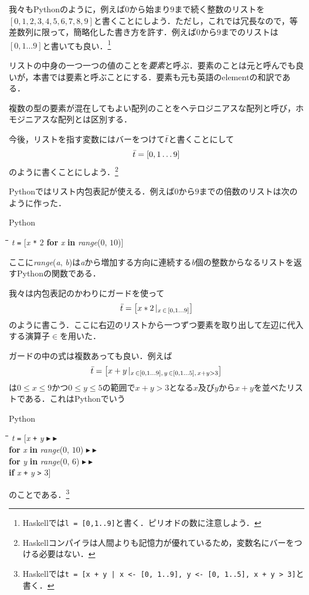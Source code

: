 \documentclass[twocolumn]{jsbook}
\newcommand{\programminglanguage}[1]{\textsf{#1}}
\newcommand{\haskell}{\programminglanguage{Haskell}}
\newcommand{\python}{\programminglanguage{Python}}
\newcommand{\code}[1]{\texttt{#1}}
\newcommand{\keyword}[1]{{\emph{#1}}}
\newenvironment{pythoncode}{\begin{itembox}[r]{\python}}{\end{itembox}}
\newenvironment{pythontab}{\begin{tabbing}\hspace*{1em}\=\hspace*{1em}\=\hspace*{1em}\=\hspace*{1em}\=\kill}{\end{tabbing}}
\newcommand{\pthnId}[1]{\textit{#1}}
\newcommand{\pthnKeyword}[1]{\textbf{#1}}
\newcommand{\pthnOp}[1]{\texttt{#1}}
\newcommand{\pthnNextLine}{$\blacktriangleright\blacktriangleright$}
\newcommand{\hsklList}[1]{\Bar{#1}}
\DeclareMathOperator{\mathFrom}{\in}
\newcommand{\mathGuard}[1]{\mathop{\mid_{#1}}}
\begin{document}
我々も\python のように，例えば$0$から始まり$9$まで続く整数のリストを$[0,1,2,3,4,5,6,7,8,9]$と書くことにしよう．ただし，これでは冗長なので，等差数列に限って，簡略化した書き方を許す．例えば$0$から$9$までのリストは$[0,1\dots9]$と書いても良い．\footnote{\haskell では\code{l = [0,1..9]}と書く．ピリオドの数に注意しよう．}

リストの中身の一つ一つの値のことを\keyword{要素}と呼ぶ．要素のことは元と呼んでも良いが，本書では要素と呼ぶことにする．要素も元も英語のelementの和訳である．

複数の型の要素が混在してもよい配列のことをヘテロジニアスな配列と呼び，ホモジニアスな配列とは区別する．

今後，リストを指す変数にはバーをつけて$\hsklList{t}$と書くことにして
\begin{equation}
\hsklList{t}=[0,1\dots9]
\end{equation}
のように書くことにしよう．\footnote{\haskell コンパイラは人間よりも記憶力が優れているため，変数名にバーをつける必要はない．}

\python ではリスト内包表記が使える．例えば$0$から$9$までの倍数のリストは次のように作った．
\begin{pythoncode}
\begin{pythontab}
\pthnId{t} \pthnOp{=} [\pthnId{x} \pthnOp{*} $2$ \pthnKeyword{for} \pthnId{x} \pthnKeyword{in} \pthnId{range}($0$, $10$)]
\end{pythontab}
\end{pythoncode}
ここに\pthnId{range}(\pthnId{a}, \pthnId{b})は\pthnId{a}から増加する方向に連続する\pthnId{b}個の整数からなるリストを返す\python の関数である．

我々は内包表記のかわりにガードを使って
\begin{equation}
\hsklList{t}=\left[x*2\mathGuard{x\mathFrom{[0,1\dots9]}}\right]
\end{equation}
のように書こう．ここに右辺のリストから一つずつ要素を取り出して左辺に代入する演算子$\mathFrom$を用いた．

ガードの中の式は複数あっても良い．例えば
\begin{equation}
\hsklList{t}=\left[x+y\mathGuard{x\mathFrom[0,1\dots9],\,y\mathFrom[0,1\dots5],\,x+y>3}\right]
\end{equation}
は$0\le x\le9$かつ$0\le y\le5$の範囲で$x+y>3$となる$x$及び$y$から$x+y$を並べたリストである．これは\python でいう
\begin{pythoncode}
\begin{pythontab}
\pthnId{t} \pthnOp{=} [\pthnId{x} \pthnOp{+} \pthnId{y} \pthnNextLine\\
\>\pthnKeyword{for} \pthnId{x} \pthnKeyword{in} \pthnId{range}($0$, $10$) \pthnNextLine\\
\>\>\pthnKeyword{for} \pthnId{y} \pthnKeyword{in} \pthnId{range}($0$, $6$) \pthnNextLine\\
\>\>\>\pthnKeyword{if} \pthnId{x} \pthnOp{+} \pthnId{y} \pthnOp{>} $3$]
\end{pythontab}
\end{pythoncode}
のことである．\footnote{\haskell では\code{t = [x + y | x <- [0, 1..9], y <- [0, 1..5], x + y > 3]}と書く．}
\end{document}

